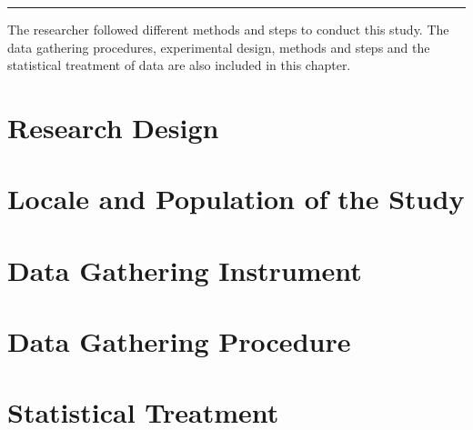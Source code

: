 
\vspace{-1cm}\noindent\rule{\textwidth}{0.4pt}

The researcher followed different methods and 
steps to conduct this study. The data gathering
procedures, experimental design, methods and steps 
and the statistical treatment of data are also 
included in this chapter.

\section{Research Design}

\section{Locale and Population of the Study}

\section{Data Gathering Instrument}

\section{Data Gathering Procedure}

\section{Statistical Treatment}